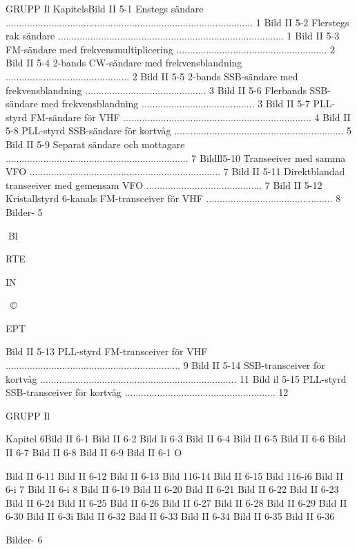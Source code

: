 GRUPP Il
KapitelsBild II 5-1
Enstegs sändare ............................................................................................ 1
Bild II 5-2
Flerstegs rak sändare .................................................................................... 1
Bild II 5-3
FM-sändare med frekvensmultiplicering ........................................................ 2
Bild II 5-4
2-bands CW-sändare med frekvensblandning .............................................. 2
Bild II 5-5
2-bands SSB-sändare med frekvensblandning ............................................. 3
Bild II 5-6
Flerbands SSB-sändare med frekvensblandning .......................................... 3
Bild II 5-7
PLL-styrd FM-sändare för VHF ...................................................................... 4
Bild II 5-8
PLL-styrd SSB-sändare för kortvåg ............................................................... 5
Bild II 5-9
Separat sändare och mottagare .................................................................... 7
Bildll5-10 Transeeiver med samma VFO ....................................................................... 7
Bild II 5-11 Direktblandad transeeiver med gemensam VFO ........................................... 7
Bild II 5-12 Kristallstyrd 6-kanals FM-transceiver för VHF ............................................... 8
Bilder- 5

Bl

RTE

IN

~©~

EPT

Bild II 5-13 PLL-styrd FM-transceiver för VHF ................................................................. 9
Bild II 5-14 SSB-transceiver för kortvåg ......................................................................... 11
Bild il 5-15 PLL-styrd SSB-transceiver för kortvåg ........................................................ 12

GRUPP Il

Kapitel 6Bild II 6-1
Bild II 6-2
Bild Ii 6-3
Bild II 6-4
Bild II 6-5
Bild II 6-6
Bild II 6-7
Bild II 6-8
Bild II 6-9
Bild II 6-1 O

Bild II 6-11
Bild II 6-12
Bild II 6-13
Bild 116-14
Bild II 6-15
Bild 116-i6
Bild II 6-i 7
Bild II 6-i 8
Bild II 6-19
Bild II 6-20
Bild II 6-21
Bild II 6-22
Bild II 6-23
Bild II 6-24
Bild II 6-25
Bild II 6-26
Bild II 6-27
Bild II 6-28
Bild II 6-29
Bild II 6-30
Bild II 6-3i
Bild II 6-32
Bild II 6-33
Bild II 6-34
Bild II 6-35
Bild II 6-36

Bilder- 6


